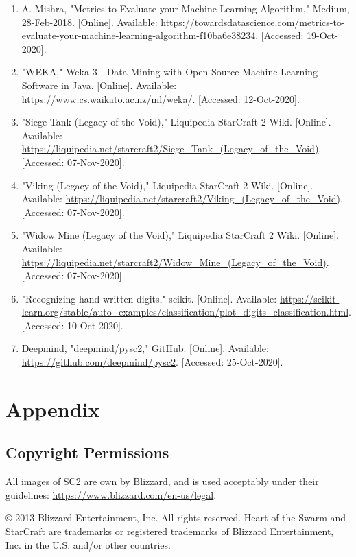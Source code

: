 \documentclass[a4paper,12pt]{report}
\begin{document}
\begin{enumerate}
\item A. Mishra, "Metrics to Evaluate your Machine Learning Algorithm," Medium, 28-Feb-2018. [Online]. Available: \url{https://towardsdatascience.com/metrics-to-evaluate-your-machine-learning-algorithm-f10ba6e38234}. [Accessed: 19-Oct-2020]. 
\item "WEKA," Weka 3 - Data Mining with Open Source Machine Learning Software in Java. [Online]. Available: \url{https://www.cs.waikato.ac.nz/ml/weka/}. [Accessed: 12-Oct-2020]. 
\item "Siege Tank (Legacy of the Void)," Liquipedia StarCraft 2 Wiki. [Online]. Available: \url{https://liquipedia.net/starcraft2/Siege_Tank_(Legacy_of_the_Void)}. [Accessed: 07-Nov-2020]. 
\item "Viking (Legacy of the Void)," Liquipedia StarCraft 2 Wiki. [Online]. Available: \url{https://liquipedia.net/starcraft2/Viking_(Legacy_of_the_Void)}. [Accessed: 07-Nov-2020]. 
\item "Widow Mine (Legacy of the Void)," Liquipedia StarCraft 2 Wiki. [Online]. Available: \url{https://liquipedia.net/starcraft2/Widow_Mine_(Legacy_of_the_Void)}. [Accessed: 07-Nov-2020]. 
\item "Recognizing hand-written digits," scikit. [Online]. Available: \url{https://scikit-learn.org/stable/auto_examples/classification/plot_digits_classification.html}. [Accessed: 10-Oct-2020]. 
\item Deepmind, "deepmind/pysc2," GitHub. [Online]. Available: \url{https://github.com/deepmind/pysc2}. [Accessed: 25-Oct-2020].
\end{enumerate}

\chapter{Appendix}
\section{Copyright Permissions}

All images of SC2 are own by Blizzard, and is used acceptably under their guidelines: \url{https://www.blizzard.com/en-us/legal}.

© 2013 Blizzard Entertainment, Inc. All rights reserved. Heart of the Swarm and StarCraft are trademarks or registered trademarks of Blizzard Entertainment, Inc. in the U.S. and/or other countries.
\end{document}
